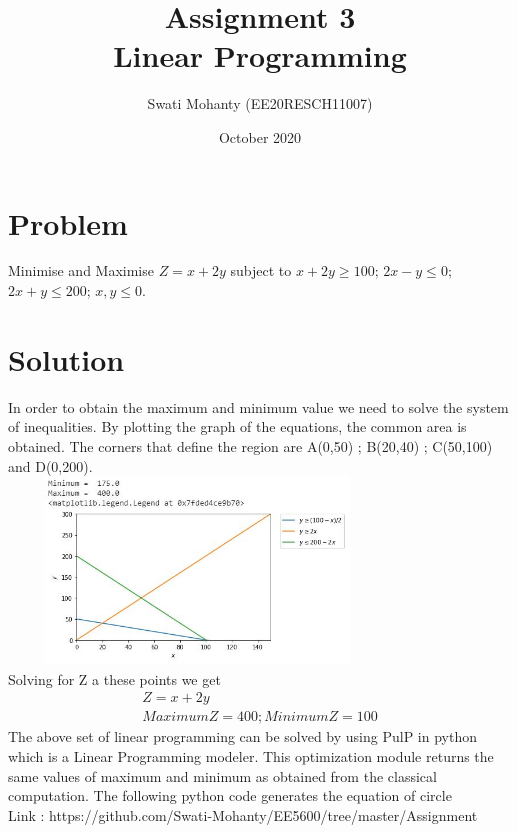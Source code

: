 \documentclass[journal,12pt,twocolumn]{IEEEtran}
\title{Assignment 3
\\Linear Programming }
\author{Swati Mohanty (EE20RESCH11007) }
\date{October 2020}
\begin{document}
\maketitle


\section{Problem}
Minimise and Maximise $Z=x+2y$ subject to $x+2y\geq100$; $2x-y\leq0$; $2x+y\leq200$; $x,y\leq0$.
\section{Solution}
In order to obtain the maximum and minimum value we need to solve the system of inequalities. By plotting the graph of the equations, the common area is obtained. The corners that define the region are A(0,50) ; B(20,40) ; C(50,100)  and D(0,200).
\\\includegraphics[width=10cm, height=5cm]{plot.jpg}
\\Solving for Z a these points we get
\begin{align}
    Z = x + 2y
    \\
    Maximum Z = 400 ; Minimum Z = 100
\end{align}
The above set of linear programming can be solved by using PulP in python which is a Linear Programming modeler. This optimization module returns the same values of maximum and minimum as obtained from the classical computation.
The following python code generates the equation of circle
\\Link : https://github.com/Swati-Mohanty/EE5600/tree/master/Assignment%
\end{document}
